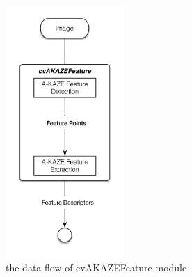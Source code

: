 \begin{figure}[H]
  \centering
  \includegraphics[width=45mm]{figures/cv_akaze_feature}
  \caption{the data flow of cvAKAZEFeature module}\label{fig:cv_akaze_feature}
\end{figure}
